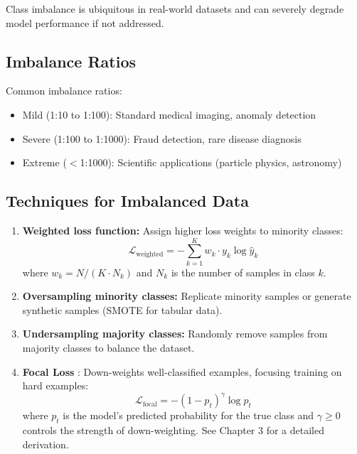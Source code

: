 Class imbalance is ubiquitous in real-world datasets and can severely degrade model performance if not addressed.

\subsection{Imbalance Ratios}

Common imbalance ratios:
\begin{itemize}
    \item Mild (1:10 to 1:100): Standard medical imaging, anomaly detection
    \item Severe (1:100 to 1:1000): Fraud detection, rare disease diagnosis
    \item Extreme ($<$1:1000): Scientific applications (particle physics, astronomy)
\end{itemize}

\subsection{Techniques for Imbalanced Data}

\begin{enumerate}
    \item \textbf{Weighted loss function:} Assign higher loss weights to minority classes:
    \begin{equation}
    \mathcal{L}_{\text{weighted}} = -\sum_{k=1}^{K} w_k \cdot y_k \log \hat{y}_k
    \end{equation}
    where $w_k = N / (K \cdot N_k)$ and $N_k$ is the number of samples in class $k$.
    
    \item \textbf{Oversampling minority classes:} Replicate minority samples or generate synthetic samples (SMOTE for tabular data).
    
    \item \textbf{Undersampling majority classes:} Randomly remove samples from majority classes to balance the dataset.
    
    \item \textbf{Focal Loss} \cite{lin2017focal}: Down-weights well-classified examples, focusing training on hard examples:
    \begin{equation}
    \mathcal{L}_{\text{focal}} = -(1 - p_t)^\gamma \log p_t
    \end{equation}
    where $p_t$ is the model's predicted probability for the true class and $\gamma \geq 0$ controls the strength of down-weighting. See Chapter 3 for a detailed derivation.
\end{enumerate}

